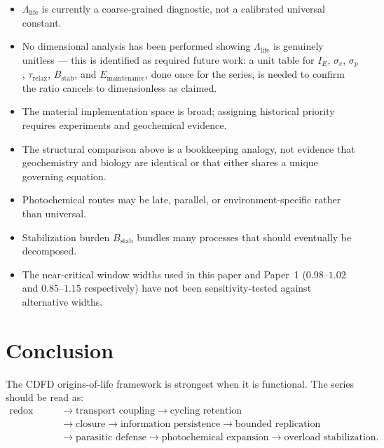 \documentclass[11pt,a4paper]{article}
\begin{document}
\begin{itemize}
 \item $\Lambda_{\mathrm{life}}$ is currently a coarse-grained diagnostic, not a calibrated universal constant.
 \item No dimensional analysis has been performed showing $\Lambda_{\mathrm{life}}$ is genuinely unitless --- this is identified as required future work: a unit table for $I_E$, $\sigma_e$, $\sigma_p$, $\tau_{\mathrm{relax}}$, $B_{\mathrm{stab}}$, and $E_{\mathrm{maintenance}}$, done once for the series, is needed to confirm the ratio cancels to dimensionless as claimed.
 \item The material implementation space is broad; assigning historical priority requires experiments and geochemical evidence.
 \item The structural comparison above is a bookkeeping analogy, not evidence that geochemistry and biology are identical or that either shares a unique governing equation.
 \item Photochemical routes may be late, parallel, or environment-specific rather than universal.
 \item Stabilization burden $B_{\mathrm{stab}}$ bundles many processes that should eventually be decomposed.
 \item The near-critical window widths used in this paper and Paper~1 ($0.98$--$1.02$ and $0.85$--$1.15$ respectively) have not been sensitivity-tested against alternative widths.
\end{itemize}

\section{Conclusion}

The CDFD origins-of-life framework is strongest when it is functional. The series should be read as:
\begin{equation}
\begin{aligned}
\text{redox work}
&\rightarrow
\text{transport coupling}
\rightarrow
\text{cycling retention} \\
&\rightarrow
\text{closure}
\rightarrow
\text{information persistence}
\rightarrow
\text{bounded replication} \\
&\rightarrow
\text{parasitic defense}
\rightarrow
\text{photochemical expansion}
\rightarrow
\text{overload stabilization}.
\end{aligned}
\end{equation}
\end{document}
